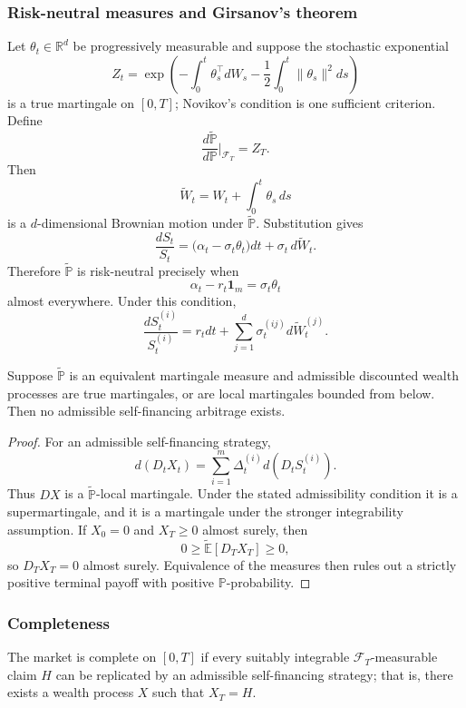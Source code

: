\subsubsection*{Risk-neutral measures and Girsanov's theorem}

Let $\theta_t\in\mathbb{R}^d$ be progressively measurable and suppose the stochastic exponential
\[
Z_t
=\exp\!\left(
 -\int_0^t\theta_s^\top dW_s
 -\frac12\int_0^t\|\theta_s\|^2ds
\right)
\]
is a true martingale on $[0,T]$; Novikov's condition is one sufficient criterion. Define
\[
\frac{d\widetilde{\mathbb{P}}}{d\mathbb{P}}
\bigg|_{\mathcal{F}_T}=Z_T.
\]
Then
\[
\widetilde W_t=W_t+\int_0^t\theta_s\,ds
\]
is a $d$-dimensional Brownian motion under $\widetilde{\mathbb{P}}$. Substitution gives
\[
\frac{dS_t}{S_t}
=\bigl(\alpha_t-\sigma_t\theta_t\bigr)dt
 +\sigma_t\,d\widetilde W_t.
\]
Therefore $\widetilde{\mathbb{P}}$ is risk-neutral precisely when
\[
\boxed{\alpha_t-r_t\mathbf{1}_m=\sigma_t\theta_t}
\]
almost everywhere. Under this condition,
\[
\frac{dS_t^{(i)}}{S_t^{(i)}}
=r_tdt+\sum_{j=1}^d\sigma_t^{(ij)}d\widetilde W_t^{(j)}.
\]

\begin{thm}
Suppose $\widetilde{\mathbb{P}}$ is an equivalent martingale measure and admissible discounted wealth processes are true martingales, or are local martingales bounded from below. Then no admissible self-financing arbitrage exists.
\end{thm}

\begin{proof}
For an admissible self-financing strategy,
\[
d(D_tX_t)
 =\sum_{i=1}^m\Delta_t^{(i)}d(D_tS_t^{(i)}).
\]
Thus $DX$ is a $\widetilde{\mathbb{P}}$-local martingale. Under the stated admissibility condition it is a supermartingale, and it is a martingale under the stronger integrability assumption. If $X_0=0$ and $X_T\geq0$ almost surely, then
\[
0\geq\widetilde{\mathbb{E}}[D_TX_T]\geq0,
\]
so $D_TX_T=0$ almost surely. Equivalence of the measures then rules out a strictly positive terminal payoff with positive $\mathbb{P}$-probability.
\end{proof}

\subsubsection*{Completeness}

\begin{de}
The market is complete on $[0,T]$ if every suitably integrable $\mathcal{F}_T$-measurable claim $H$ can be replicated by an admissible self-financing strategy; that is, there exists a wealth process $X$ such that $X_T=H$.
\end{de}

